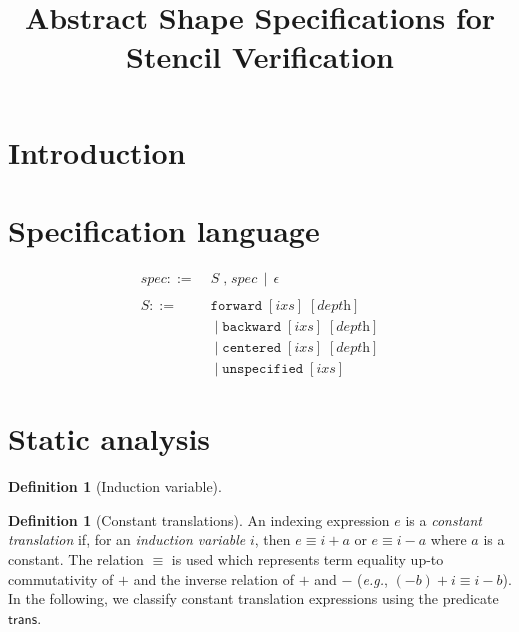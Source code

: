 \documentclass[10pt]{sigplanconf}
\title{Abstract Shape Specifications for Stencil Verification}
\newcounter{block}
\theoremstyle{definition}
\newtheorem{definition}[block]{Definition}
\newcommand{\eg}{\emph{e.g.}}
\begin{document}
\maketitle

\begin{abstract}
\end{abstract}



\section{Introduction}


\section{Specification language}

\begin{align*}
spec ::= & \; S  \; \texttt{,} \; spec \, \mid \, \epsilon \\ \\
%
S ::= &  \; \texttt{forward} \; [\textit{ixs}] \; [\textit{depth}] \\
& \; \mid \texttt{backward} \; [\textit{ixs}] \; [\textit{depth}] \\
& \; \mid \texttt{centered} \; [\textit{ixs}] \; [\textit{depth}] \\
& \; \mid \texttt{unspecified} \; [\textit{ixs}]
\end{align*}

\section{Static analysis}

\begin{definition}[Induction variable]

\end{definition}

\begin{definition}[Constant translations]
An indexing expression $e$ is a \emph{constant translation} if,
for an \emph{induction variable} $i$, then $e \equiv i + a$ or $e \equiv i - a$ 
where $a$ is a constant. The relation $\equiv$ is used which
represents term equality up-to commutativity of $+$ and the inverse
relation of $+$ and $-$ (\eg{}, $(-b) + i \equiv i - b$). 
In the following, we classify constant translation expressions 
using the predicate $\textsf{trans}$.
\end{definition}
\end{document}
